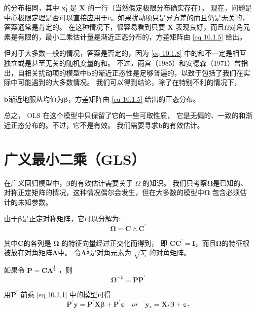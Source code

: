     的分布相同，其中 $ \boldsymbol{x_i^{\prime}} $ 是 $ \boldsymbol{X} $ 的一行（当然假定极限分布确实存在）。
    现在，问题是中心极限定理是否可以直接应用于$ v $。如果扰动项只是异方差的而且仍是无关的，答案通常是肯定的。
    在这种情况下，很容易看到只要 $ \boldsymbol{X} $ 表现良好，而且$ \Omega $对角元素是有限的，最小二乘估计量是渐近正态分布的，方差矩阵由 \ref{eq 10.1.5} 给出。

    但对于大多数一般的情况，答案是否定的，因为 \eqref{eq 10.1.8} 中的和不一定是相互独立或是甚至无关的随机变量的和。
    不过，雨宫（1985）和安德森（1971）曾指出，自相关扰动项的模型中$ \boldsymbol{b} $的渐近正态性是足够普遍的，以致于包括了我们在实际中可能遇到的大多数情况。
    我们可以得到结论，除了在特别不利的情况下，

    $ \boldsymbol{b} $渐近地服从均值为$ \boldsymbol{\beta} $，方差矩阵由 \eqref{eq 10.1.5} 给出的正态分布。
    
    总之， OLS 在这个模型中只保留了它的一些可取性质， 它是无偏的、一致的和渐近正态分布的。不过，它不是有效。 我们需要寻求$ \boldsymbol{b} $的有效估计。

\section{广义最小二乘（GLS）}

在广义回归模型中，$ \boldsymbol{\beta} $的有效估计需要关于 $ \Omega $ 的知识。
我们只考察$ \boldsymbol{\Omega} $是已知的、对称正定矩阵的情况，这种情况偶尔会发生，但在大多数的模型中$ \boldsymbol{\Omega} $ 包含必须估计的未知参数。

由于$ \boldsymbol{\beta} $是正定对称矩阵，它可以分解为:
\begin{equation}
    \boldsymbol{\Omega=C \wedge C^{\prime}}
\end{equation}

其中$ \boldsymbol{C} $的各列是 $ \boldsymbol{\Omega} $  的特征向量经过正交化而得到，
即 $ \boldsymbol{CC^{\prime} =I} $，而且$ \boldsymbol{\Omega} $的特征根被放在对角矩阵$ \boldsymbol{\Lambda} $中。
令$ \boldsymbol{\Lambda^{\frac{1}{2}}} $是对角元素为 $ \sqrt{ \lambda_{i}} $ 的对角矩阵。

如果令 $ \boldsymbol{P = C \Lambda^{\frac{1}{2}} } $ ，则
$$  \boldsymbol{\Omega^{-1}=P P^{\prime}} $$

用$ \boldsymbol{P^{\prime}} $ 前乘 \ref{eq 10.1.1} 中的模型可得
\begin{equation}
    \boldsymbol{P^{\prime} y=P^{\prime} X \beta+P^{\prime} \varepsilon} \quad or \quad \boldsymbol{y_{*}=X_{*} \beta+\varepsilon_{*}}
    \label{eq 10.2.2}
\end{equation}

